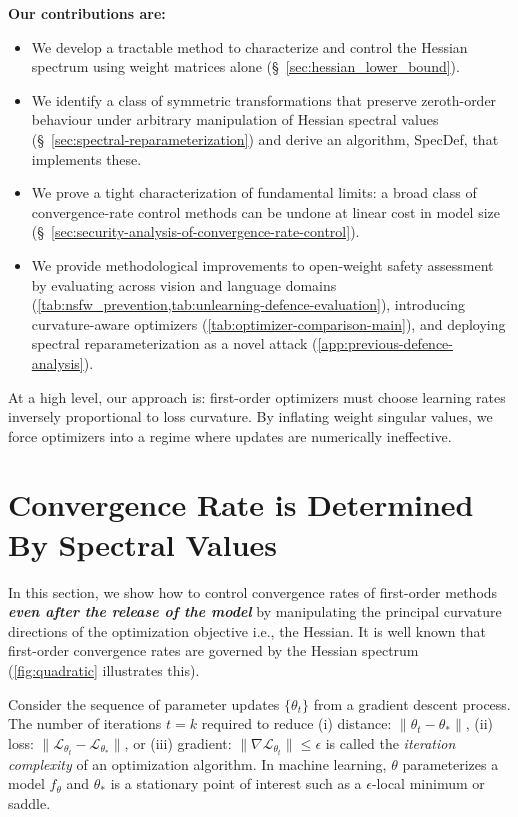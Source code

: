 \documentclass{article}
\theoremstyle{plain}
\theoremstyle{definition}
\theoremstyle{remark}
\begin{document}
\textbf{Our contributions are:}
\begin{itemize}[leftmargin=*,nolistsep]
\item[(i)] We develop a tractable method to characterize and control the Hessian spectrum using weight matrices alone (\S~\ref{sec:hessian_lower_bound}). 
\item[(ii)] We identify a class of symmetric transformations that preserve zeroth-order behaviour under arbitrary manipulation of Hessian spectral values (\S~\ref{sec:spectral-reparameterization}) and derive an algorithm, SpecDef, that implements these.
\item[(iii)] We prove a tight characterization of fundamental limits: a broad class of convergence-rate control methods can be undone at linear cost in model size (\S~\ref{sec:security-analysis-of-convergence-rate-control}).
\item[(iv)] We provide methodological improvements to open-weight safety assessment by evaluating across vision and language domains (\cref{tab:nsfw_prevention,tab:unlearning-defence-evaluation}), introducing curvature-aware optimizers (\cref{tab:optimizer-comparison-main}), and deploying spectral reparameterization as a novel attack (\cref{app:previous-defence-analysis}).

\end{itemize}
At a high level, our approach is: first-order optimizers must choose learning rates inversely proportional to loss curvature. By inflating weight singular values, we force optimizers into a regime where updates are numerically ineffective.
\section{Convergence Rate is Determined By Spectral Values}

In this section, we show how to control convergence rates of first-order methods \textbf{\textit{even after the release of the model}} by manipulating the principal curvature directions of the optimization objective i.e., the Hessian. It is well known that first-order convergence rates are governed by the Hessian spectrum \citep{Wright_Recht_2022} (\cref{fig:quadratic} illustrates this).

Consider the sequence of parameter updates $\{\theta_t\}$ from a gradient descent process. The number of iterations $t=k$ required to reduce (i) distance: $\|\theta_t - \theta_*\|$, (ii) loss: $\|\mathcal{L}_{\theta_t} - \mathcal{L}_{\theta_*}\|$, or (iii) gradient: $\|\nabla \mathcal{L}_{\theta_t}\| \leq \epsilon$ is called the \textit{iteration complexity} of an optimization algorithm. In machine learning, $\theta$ parameterizes a model $f_{\theta}$ and $\theta_*$ is a stationary point of interest such as a $\epsilon$-local minimum  or saddle.
\end{document}
